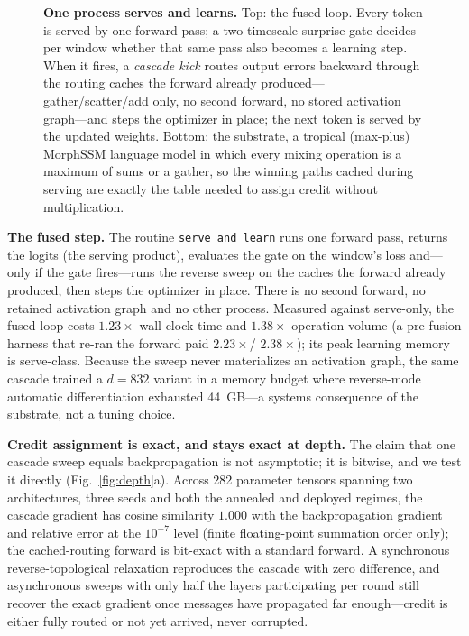 \documentclass[11pt]{article}
\newcommand{\heading}[1]{\vspace{4pt}\noindent\textbf{#1}\hspace{0.6em}}
\begin{document}
\begin{figure}[t]
\caption{\textbf{One process serves and learns.} Top: the fused loop. Every
token is served by one forward pass; a two-timescale surprise gate decides
per window whether that same pass also becomes a learning step. When it fires,
a \emph{cascade kick} routes output errors backward through the routing caches
the forward already produced---gather/scatter/add only, no second forward, no
stored activation graph---and steps the optimizer in place; the next token is
served by the updated weights. Bottom: the substrate, a tropical (max-plus)
MorphSSM language model in which every mixing operation is a maximum of sums or
a gather, so the winning paths cached during serving are exactly the table
needed to assign credit without multiplication.}
\label{fig:loop}
\end{figure}

\heading{The fused step.}
The routine \texttt{serve\_and\_learn} runs one forward pass, returns the
logits (the serving product), evaluates the gate on the window's loss and---only
if the gate fires---runs the reverse sweep on the caches the forward already
produced, then steps the optimizer in place. There is no second forward, no
retained activation graph and no other process. Measured against serve-only,
the fused loop costs $1.23\times$ wall-clock time and $1.38\times$ operation
volume (a pre-fusion harness that re-ran the forward paid $2.23\times$/%
$2.38\times$); its peak learning memory is serve-class. Because the sweep never
materializes an activation graph, the same cascade trained a $d{=}832$ variant
in a memory budget where reverse-mode automatic differentiation exhausted
44~GB---a systems consequence of the substrate, not a tuning choice.

\heading{Credit assignment is exact, and stays exact at depth.}
The claim that one cascade sweep equals backpropagation is not asymptotic; it is
bitwise, and we test it directly (Fig.~\ref{fig:depth}a). Across 282 parameter
tensors spanning two architectures, three seeds and both the annealed and
deployed regimes, the cascade gradient has cosine similarity $1.000$ with the
backpropagation gradient and relative error at the $10^{-7}$ level (finite
floating-point summation order only); the cached-routing forward is bit-exact
with a standard forward. A synchronous reverse-topological relaxation reproduces
the cascade with zero difference, and asynchronous sweeps with only half the
layers participating per round still recover the exact gradient once messages
have propagated far enough---credit is either fully routed or not yet arrived,
never corrupted.
\end{document}

